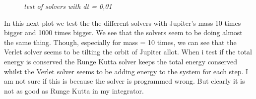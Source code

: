 \documentclass[norsk,a4paper,12pt]{article}
\begin{document}
\begin{figure}[H]
\begin{center}
    \end{center}
 \caption{\textit{test of solvers with dt = 0,01 }}
  \label{fig:edge}
\end{figure}

In this next plot we test the the different solvers with Jupiter's mass 10 times bigger and 1000 times bigger. We see that the 
solvers seem to be doing almost the same thing. Though, especially for mass = 10 times, we can see that the Verlet solver seems to
be tilting the orbit of Jupiter allot. When i test if the total energy is conserved the Runge Kutta solver keeps the total energy
conserved whilst the Verlet solver seems to be adding energy to the system for each step. I am not sure if this is because the
solver is programmed wrong. But clearly it is not as good as Runge Kutta in my integrator.
\end{document}
